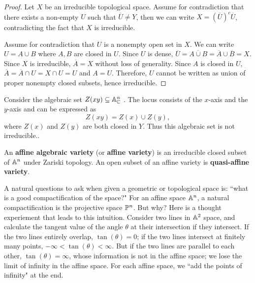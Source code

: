    \begin{proof}
	Let $X$ be an irreducible topological space.
	Assume for contradiction that 
	there exists a non-empty $U$ 
	such that $\overline{U} \ne Y$,
	then we can write $X = (\overline{U})^c \overline{U}$, 
	contradicting the fact that $X$ is irreducible. 

	Assume for contradiction that 
	$U$ is a nonempty open set in $X$.
	We can write $U = A \cup B$ where 
	$A, B$ are closed in $U$. 
	Since $U$ is dense, 
	$\overline{U} = \overline{A \cup B} = \overline{A} \cup \overline{B} = X$.
	Since $X$ is irreducible, 
	$\overline{A} = X$ without loss of generality.
	Since $A$ is closed in $U$, 
	$\overline{A} = \overline{A} \cap U = X \cap U = U$ and $A = U$.
	Therefore, $U$ cannot be written 
	as union of proper nonempty closed subsets, 
	hence irreducible. 			
   \end{proof}
   
   \begin{example}
   	Consider the algebraic set $Z(xy) \subseteq \A_{\C}^n$ .
	The locus consists of the $x$-axis and the $y$-axis
	and can be expressed as 
	\[
	Z(xy) = Z(x) \cup Z(y),
	\]
	where $Z(x)$ and $Z(y)$ are both closed in $Y$. 
	Thus this algebraic set is not irreducible.. 
   \end{example}
   
   \begin{definition}
   	An \textbf{affine algebraic variety} (or \textbf{affine variety})
	is an irreducible closed subset of $\A^n$ under Zariski topology.
	An open subset of an affine variety is \textbf{quasi-affine variety}.
   \end{definition}
   
   A natural questions to ask 
   when given a geometric or topological space is:
   ``what is a good compactification of the space?"
   For an affine space $\A^n$, 
   a natural compactification is the projective space $\P^n$.
   But why? 
   Here is a thought experiement that leads to this intuition.
   Consider two lines in $\A^2$ space,
   and calculate the tangent value of the angle $\theta$ at their intersection
   if they intersect.
   If the two lines entirely overlap, $\tan(\theta) = 0$;
   if the two lines intersect at finitely many points, $-\infty < \tan(\theta) < \infty$.
   But if the two lines are parallel to each other,
   $\tan(\theta) = \infty$, whose information is not in the affine space;
   we lose the limit of infinity in the affine space. 
   For each affine space, we ``add the points of infinity" at the end.
   
